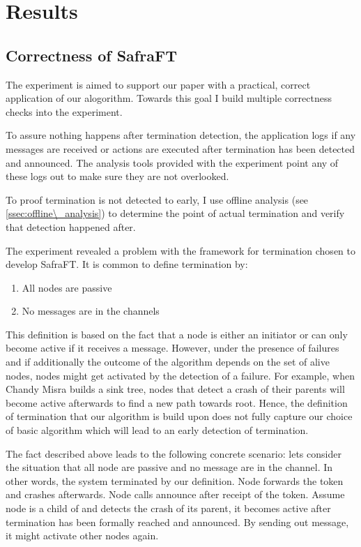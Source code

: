 \section{Results}
\label{sec:results}

\subsection{Correctness of SafraFT}
The experiment is aimed to support our paper with a practical, correct application of our alogorithm.
Towards this goal I build multiple correctness checks into the experiment. 

To assure nothing happens after termination detection, the application logs if any messages are received or actions are executed after termination has been detected and announced. 
The analysis tools provided with the experiment point any of these logs out to make sure they are not overlooked.

To proof termination is not detected to early, I use offline analysis (see \cref{ssec:offline\_analysis}) to determine the point of actual termination and verify that detection happened after.

The experiment revealed a problem with the framework for termination chosen to develop SafraFT.
It is common to define termination by:
\begin{enumerate}
	\item All nodes are passive
	\item No messages are in the channels
\end{enumerate}
This definition is based on the fact that a node is either an initiator or can only become active if it receives a message. 
However, under the presence of failures and if additionally the outcome of the algorithm depends on the set of alive nodes, nodes might get activated by the detection of a failure.
For example, when Chandy Misra builds a sink tree, nodes that detect a crash of their parents will become active afterwards to find a new path towards root.
Hence, the definition of termination that our algorithm is build upon does not fully capture our choice of basic algorithm which will lead to an early detection of termination.

The fact described above leads to the following concrete scenario: lets consider the situation that all node are passive and no message are in the channel. 
In other words, the system terminated by our definition.
Node  forwards the token and crashes afterwards. 
Node  calls announce after receipt of the token.
Assume node  is a child of  and detects the crash of its parent, it becomes active after termination has been formally reached and announced.
By sending out  message, it might activate other nodes again.

